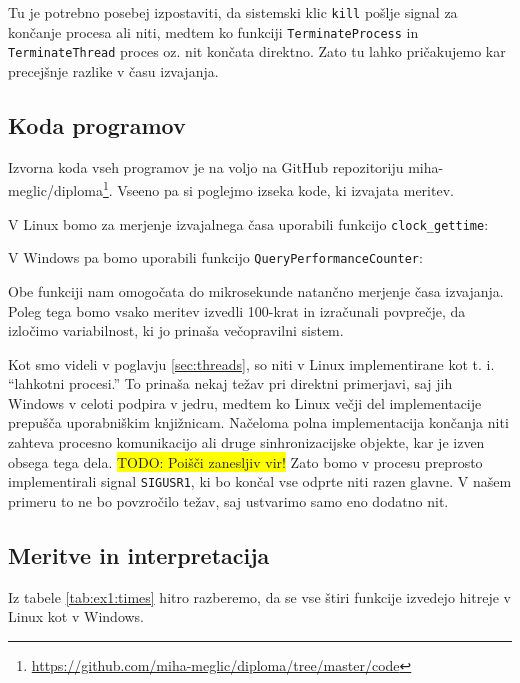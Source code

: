 \documentclass[a4paper,12pt,openright]{book}
\begin{document}
Tu je potrebno posebej izpostaviti, da sistemski klic \texttt{kill} pošlje signal za končanje procesa ali niti, medtem ko funkciji \texttt{TerminateProcess} in \texttt{Terminate\-Thread} proces oz. nit končata direktno.
Zato tu lahko pričakujemo kar precejšnje razlike v času izvajanja.

\subsection{Koda programov}

Izvorna koda vseh programov je na voljo na GitHub repozitoriju miha-meglic/diploma\footnote{\url{https://github.com/miha-meglic/diploma/tree/master/code}}.
Vseeno pa si poglejmo izseka kode, ki izvajata meritev.

V Linux bomo za merjenje izvajalnega časa uporabili funkcijo \texttt{clock\_gettime}:


V Windows pa bomo uporabili funkcijo \texttt{QueryPerformanceCounter}:


Obe funkciji nam omogočata do mikrosekunde natančno merjenje časa izvajanja.
Poleg tega bomo vsako meritev izvedli 100-krat in izračunali povprečje, da izločimo variabilnost, ki jo prinaša večopravilni sistem.

Kot smo videli v poglavju \ref{sec:threads}, so niti v Linux implementirane kot t. i. ``lahkotni procesi.''
To prinaša nekaj težav pri direktni primerjavi, saj jih Windows v celoti podpira v jedru, medtem ko Linux večji del implementacije prepušča uporabniškim knjižnicam.
Načeloma polna implementacija končanja niti zahteva procesno komunikacijo ali druge sinhronizacijske objekte, kar je izven obsega tega dela.
\colorbox{yellow}{TODO: Poišči zanesljiv vir!}
Zato bomo v procesu preprosto implementirali signal \texttt{SIGUSR1}, ki bo končal vse odprte niti razen glavne.
V našem primeru to ne bo povzročilo težav, saj ustvarimo samo eno dodatno nit.

\subsection{Meritve in interpretacija}

Iz tabele \ref{tab:ex1:times} hitro razberemo, da se vse štiri funkcije izvedejo hitreje v Linux kot v Windows.
\end{document}
